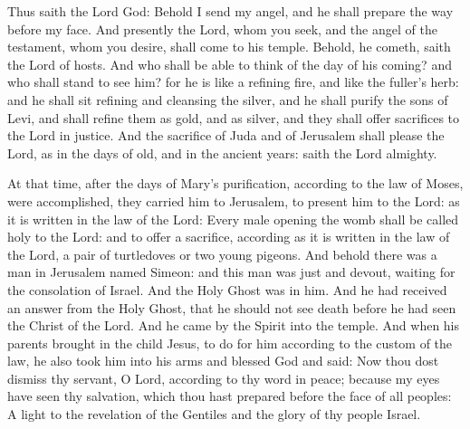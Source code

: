 \bigskip




Thus saith the Lord God:
Behold I send my angel, and he shall prepare the way before my
face. And presently the Lord, whom you seek, and the angel of the
testament, whom you desire, shall come to his temple. Behold, he cometh,
saith the Lord of hosts.
And who shall be able to think of the day of his coming? and who
shall stand to see him? for he is like a refining fire, and like the
fuller's herb:
and he shall sit refining and cleansing the silver, and he shall
purify the sons of Levi, and shall refine them as gold, and as silver,
and they shall offer sacrifices to the Lord in justice.
And the sacrifice of Juda and of Jerusalem shall please the Lord,
as in the days of old, and in the ancient years:
saith the Lord almighty.

\medskip


At that time,
after the days of Mary's purification, according to the law of
Moses, were accomplished, they carried him to Jerusalem, to present him
to the Lord:
as it is written in the law of the Lord: Every male opening the
womb shall be called holy to the Lord:
and to offer a sacrifice, according as it is written in the law of
the Lord, a pair of turtledoves or two young pigeons.
And behold there was a man in Jerusalem named Simeon: and this man
was just and devout, waiting for the consolation of Israel. And the Holy
Ghost was in him.
And he had received an answer from the Holy Ghost, that he should
not see death before he had seen the Christ of the Lord.
And he came by the Spirit into the temple. And when his parents
brought in the child Jesus, to do for him according to the custom of the
law,
he also took him into his arms and blessed God and said:
Now thou dost dismiss thy servant, O Lord, according to thy word
in peace;
because my eyes have seen thy salvation,
which thou hast prepared before the face of all peoples:
A light to the revelation of the Gentiles and the glory of thy
people Israel.

\bigskip



